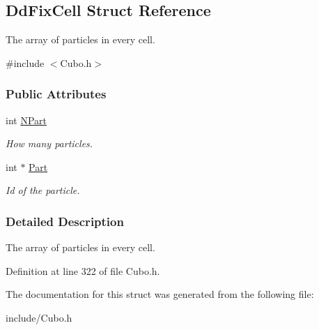 \hypertarget{structDdFixCell}{\subsection{\-Dd\-Fix\-Cell \-Struct \-Reference}
\label{structDdFixCell}
}


\-The array of particles in every cell.  




{\ttfamily \#include $<$\-Cubo.\-h$>$}

\subsubsection*{\-Public \-Attributes}
\begin{DoxyCompactItemize}
\item 
\hypertarget{structDdFixCell_abdcc792391d8c5092471dff191de47f4}{int \hyperlink{structDdFixCell_abdcc792391d8c5092471dff191de47f4}{\-N\-Part}}\label{structDdFixCell_abdcc792391d8c5092471dff191de47f4}

\begin{DoxyCompactList}\small\item\em \-How many particles. \end{DoxyCompactList}\item 
\hypertarget{structDdFixCell_a9beee0152293e683562b0dccaa209270}{int $\ast$ \hyperlink{structDdFixCell_a9beee0152293e683562b0dccaa209270}{\-Part}}\label{structDdFixCell_a9beee0152293e683562b0dccaa209270}

\begin{DoxyCompactList}\small\item\em \-Id of the particle. \end{DoxyCompactList}\end{DoxyCompactItemize}


\subsubsection{\-Detailed \-Description}
\-The array of particles in every cell. 

\-Definition at line 322 of file \-Cubo.\-h.



\-The documentation for this struct was generated from the following file\-:\begin{DoxyCompactItemize}
\item 
include/\-Cubo.\-h\end{DoxyCompactItemize}
